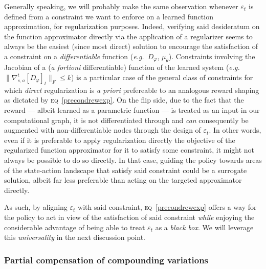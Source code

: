 Generally speaking, we will probably make the same observation whenever $\varepsilon_t$ is defined from a constraint
we want to enforce on a learned function approximation, for regularization purposes.
Indeed, verifying said desideratum on the function approximator directly via the application of a regularizer seems
to always be the easiest (since most direct) solution to encourage the satisfaction of a constraint on
a \emph{differentiable} function (\textit{e.g.}~$D_\varphi$, $\mu_\theta$).
Constraints involving the Jacobian of a (\textit{a fortioni} differentiable) function of the learned system
(\textit{e.g.}~$\lVert \nabla_{s,a}^t[D_\varphi]_t \rVert _F \leq k$)
is a particular case of the general class of constraints for which \emph{direct} regularization is
\textit{a priori} prefereable to an analogous reward shaping as dictated by \textsc{eq}~\ref{precondrewexp}.
On the flip side, due to the fact that the reward --- albeit learned as a parametric function ---
is treated as an input in our computational graph,
it is not differentiated through and \emph{can} consequently
be augmented with non-differentiable nodes through the design of $\varepsilon_t$.
In other words, even if it is preferable to apply regularization directly the objective of the regularized
function approximator for it to satisfy some constraint,
it might not always be possible to do so directly.
In that case, guiding the policy towards areas of the state-action landscape that satisfy said constraint
could be a surrogate solution, albeit far less preferable than acting on the targeted approximator directly.

As such, by aligning $\varepsilon_t$ with said constraint, \textsc{eq}~\ref{precondrewexp} offers a way for the policy
to act in view of the satisfaction of said constraint \emph{while} enjoying the considerable advantage
of being able to treat $\varepsilon_t$ as a \emph{black box}.
We will leverage this \emph{universality} in the next discussion point.

\subsubsection{Partial compensation of compounding variations}
\label{partialcompensate}

